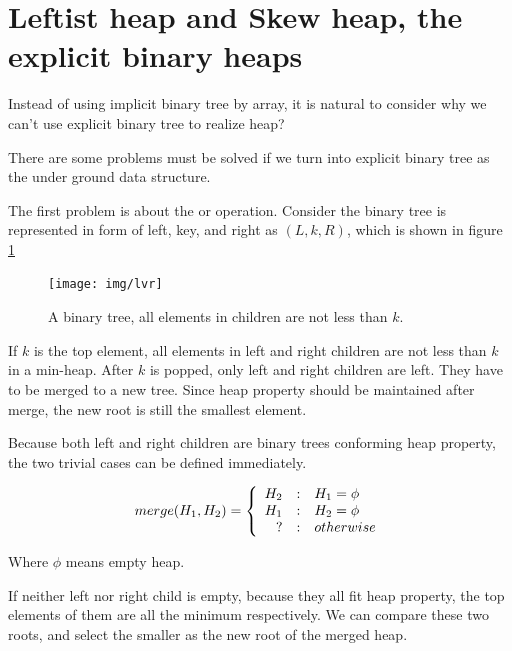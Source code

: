 \documentclass[b5paper]{article}
\begin{document}
\begin{Answer}
\end{Answer}

\section{Leftist heap and Skew heap, the explicit binary heaps}
\label{ebheap}

Instead of using implicit binary tree by array, it is natural to
consider why we can't use explicit binary tree to realize heap?

There are some problems must be solved if we turn into explicit
binary tree as the under ground data structure.

The first problem is about the  or  operation.
Consider the binary tree is represented in form of left, key, and right as
$(L, k, R)$, which is shown in figure \ref{fig:lvr}

\begin{figure}[htbp]
    \centering
    \texttt{[image: img/lvr]}
    \caption{A binary tree, all elements in children are not less than $k$.} \label{fig:lvr}
\end{figure}

If $k$ is the top element, all elements in left and right children are not less
than $k$ in a min-heap. After $k$ is popped, only left and right children are left.
They have to be merged to a new tree. Since heap property should be maintained
after merge, the new root is still the smallest element.

Because both left and right children are binary trees conforming heap property,
the two trivial cases can be defined immediately.

\[
merge(H_1, H_2) = \left \{
  \begin{array}
  {r@{\quad:\quad}l}
  H_2 & H_1 = \phi \\
  H_1 & H_2 = \phi \\
  ? & otherwise
  \end{array}
\right.
\]

Where $\phi$ means empty heap.

If neither left nor right child is empty, because they all fit
heap property, the top elements of them are all the minimum respectively.
We can compare these two roots,
and select the smaller as the new root of the merged heap.
\end{document}
